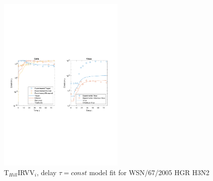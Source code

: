 \begin{figure}[H]
\begin{center}
\includegraphics[width=0.55\textwidth, trim={1cm 9.8cm 1cm 9.5cm}, clip]{D_chapters/6_appendix/4_ValidationH3N2/InfectionDepletionModelTHillIRVViDelayFitTauMOI0.002log.pdf}
\caption[T$_{Hill}$IRVV$_i$, delay $\tau = const$ model fit for WSN/67/2005 HGR H3N2]%
{T$_{Hill}$IRVV$_i$, delay $\tau = const$ model fit for WSN/67/2005 HGR H3N2}
\label{figure:THillIRVViDelayFitTauValidationRKI}
\end{center}
\end{figure}